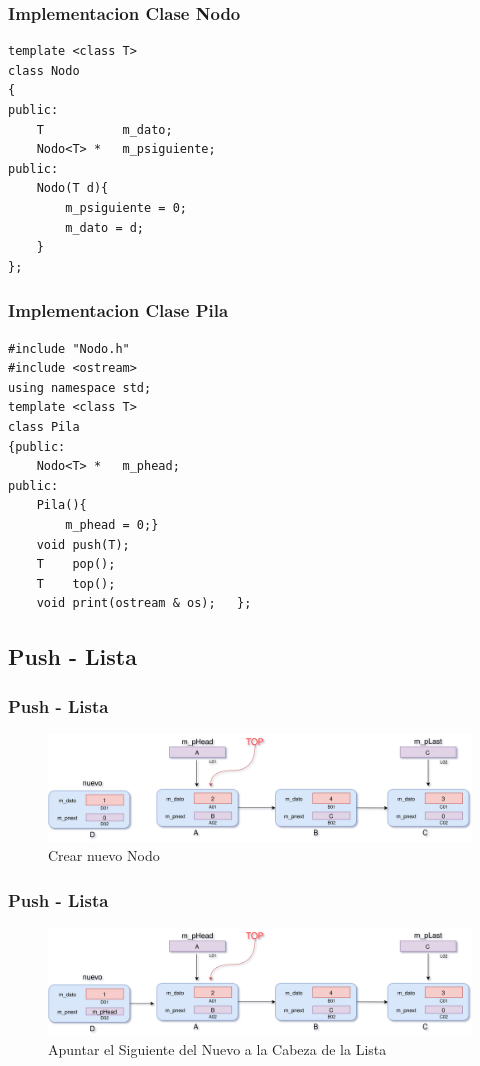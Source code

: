 \documentclass{beamer}
\begin{document}
\begin{frame}[fragile]
\frametitle{Implementacion Clase Nodo}
\begin{verbatim}
template <class T>
class Nodo
{
public:
	T           m_dato;
	Nodo<T> *   m_psiguiente;	
public:
	Nodo(T d){
		m_psiguiente = 0;
		m_dato = d;
	}
};
\end{verbatim}
\end{frame}  


\begin{frame}[fragile]
\frametitle{Implementacion Clase Pila}
\begin{verbatim}
#include "Nodo.h"
#include <ostream>
using namespace std;
template <class T>
class Pila
{public:
	Nodo<T> *   m_phead;
public:
	Pila(){
		m_phead = 0;}
	void push(T);
	T    pop();
	T    top();
	void print(ostream & os);	};
\end{verbatim}
\end{frame}  

\subsection{Push - Lista}
\begin{frame}
    \frametitle{Push - Lista}
    
    \begin{figure}
    \includegraphics[width =1 \textwidth]{images/push01}
    \caption{Crear nuevo Nodo}
    \end{figure}
       
\end{frame}

\begin{frame}
    \frametitle{Push - Lista}
    
    \begin{figure}
    \includegraphics[width =1 \textwidth]{images/push02}
    \caption{Apuntar el Siguiente del Nuevo a la Cabeza de la Lista}
    \end{figure}
       
\end{frame}
\end{document}
